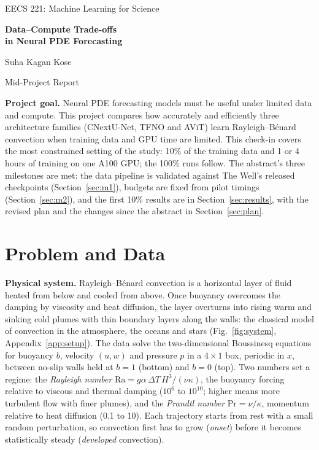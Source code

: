 \documentclass[11pt]{article}
\begin{document}
\begin{center}
    {\large EECS 221: Machine Learning for Science\par}
    \vspace{5pt}
    {\LARGE\bfseries
    Data--Compute Trade-offs\\[3pt]
    in Neural PDE Forecasting\par}
    \vspace{7pt}
    {\Large Suha Kagan Kose\par}
    \vspace{6pt}
    {\large Mid-Project Report\par}
\end{center}

\textbf{Project goal.} Neural PDE forecasting models must be useful under limited data and compute. This project
compares how accurately and efficiently three architecture families (CNextU-Net, TFNO and AViT) learn
Rayleigh--B\'enard convection when training data and GPU time are limited. This check-in covers the most
constrained setting of the study: 10\% of the training data and 1 or 4 hours of training on one A100 GPU; the
100\% runs follow. The abstract's three milestones are met: the data pipeline is validated against The Well's
released checkpoints (Section~\ref{sec:m1}), budgets are fixed from pilot timings (Section~\ref{sec:m2}), and the
first 10\% results are in Section~\ref{sec:results}, with the revised plan and the changes since the abstract in
Section~\ref{sec:plan}.

\section{Problem and Data}
\label{sec:setup}

\textbf{Physical system.} Rayleigh--B\'enard convection is a horizontal layer of fluid heated from below and cooled
from above. Once buoyancy overcomes the damping by viscosity and heat diffusion, the layer overturns into rising
warm and sinking cold plumes with thin boundary layers along the walls: the classical model of convection in the
atmosphere, the oceans and stars (Fig.~\ref{fig:system}, Appendix~\ref{app:setup}). The data solve the
two-dimensional Boussinesq equations for buoyancy $b$, velocity $(u, w)$ and pressure $p$ in a $4\times1$ box,
periodic in $x$, between no-slip walls held at $b=1$ (bottom) and $b=0$ (top). Two numbers set a regime: the
\emph{Rayleigh number} $\mathrm{Ra}=g\alpha\,\Delta T\,H^3/(\nu\kappa)$, the buoyancy forcing relative to viscous
and thermal damping ($10^6$ to $10^{10}$; higher means more turbulent flow with finer plumes), and the
\emph{Prandtl number} $\mathrm{Pr}=\nu/\kappa$, momentum relative to heat diffusion (0.1 to 10). Each trajectory
starts from rest with a small random perturbation, so convection first has to grow (\emph{onset}) before it becomes
statistically steady (\emph{developed} convection).
\end{document}
